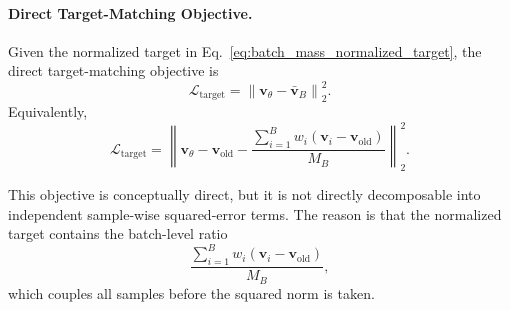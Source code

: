 \paragraph{Direct Target-Matching Objective.}

Given the normalized target in Eq.~\eqref{eq:batch_mass_normalized_target}, the
direct target-matching objective is
\begin{equation}
\boxed{
\mathcal{L}_{\mathrm{target}}
=
\left\|
\mathbf{v}_{\theta}
-
\bar{\mathbf{v}}_{B}
\right\|_2^2 .
}
\label{eq:direct_batch_target_matching_objective}
\end{equation}
Equivalently,
\begin{equation}
\mathcal{L}_{\mathrm{target}}
=
\left\|
\mathbf{v}_{\theta}
-
\mathbf{v}_{\mathrm{old}}
-
\frac{
\sum_{i=1}^{B}
w_i
\left(
\mathbf{v}_i-\mathbf{v}_{\mathrm{old}}
\right)
}{
M_B
}
\right\|_2^2 .
\label{eq:direct_batch_target_matching_expanded}
\end{equation}

This objective is conceptually direct, but it is not directly decomposable into
independent sample-wise squared-error terms. The reason is that the normalized
target contains the batch-level ratio
\[
\frac{
\sum_{i=1}^{B}
w_i
\left(
\mathbf{v}_i-\mathbf{v}_{\mathrm{old}}
\right)
}{
M_B
},
\]
which couples all samples before the squared norm is taken.
